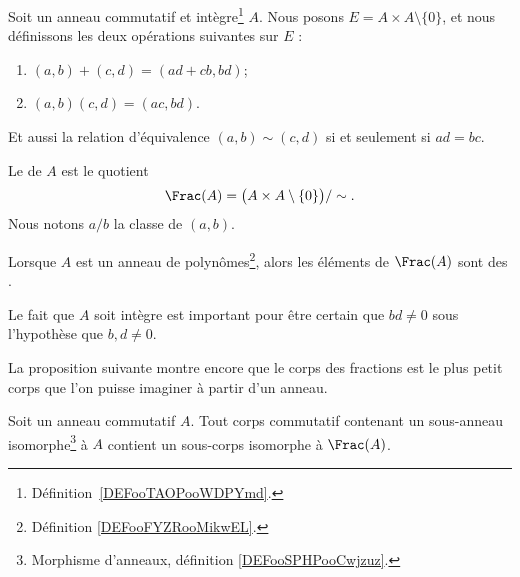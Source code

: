 \begin{definition}       \label{DEFooGJYXooOiJQvP}
    Soit un anneau commutatif et intègre\footnote{Définition~\ref{DEFooTAOPooWDPYmd}.} \( A\). Nous posons \( E=A\times A\setminus\{ 0 \}\), et nous définissons les deux opérations suivantes sur \( E\) :
    \begin{enumerate}
        \item       \label{ITEMooWBWHooYsXFkO}
            \( (a,b)+(c,d)=(ad+cb,bd)\);
        \item       \label{ITEMooGOOIooCHqLRl}
            \( (a,b)(c,d)=(ac,bd)\).
    \end{enumerate}
    Et aussi la relation d'équivalence \( (a,b)\sim(c,d)\) si et seulement si \( ad=bc\).

    Le  de \( A\) est le quotient
    \begin{equation}
        \Frac(A)=\big( A\times A\setminus\{ 0 \} \big)/\sim.
    \end{equation}
    Nous notons \( a/b\) la classe de \( (a,b)\).

    Lorsque \( A\) est un anneau de polynômes\footnote{Définition \ref{DEFooFYZRooMikwEL}.}, alors les éléments de \( \Frac(A)\) sont des .
\end{definition}
Le fait que \( A\) soit intègre est important pour être certain que \( bd\neq 0\) sous l'hypothèse que \( b,d\neq 0\).

La proposition suivante montre encore que le corps des fractions est le plus petit corps que l'on puisse imaginer à partir d'un anneau.
\begin{proposition}       \label{PROPooIJBEooDjsoHr}
    Soit un anneau commutatif \( A\). Tout corps commutatif contenant un sous-anneau isomorphe\footnote{Morphisme d'anneaux, définition \ref{DEFooSPHPooCwjzuz}.} à \( A\) contient un sous-corps isomorphe à \( \Frac(A)\).
\end{proposition}

